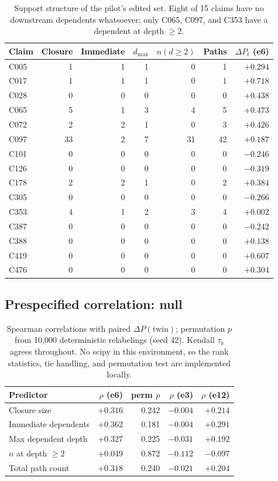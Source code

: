 \documentclass[11pt]{article}
\begin{document}
\begin{table}[h]
\centering
\begin{tabular}{lrrrrrr}
\toprule
Claim & Closure & Immediate & $d_{\max}$ & $n(d\geq2)$ & Paths & $\Delta P_t$ (e6) \\
\midrule
C005 & 1  & 1 & 1 & 0  & 1  & $+0.294$ \\
C017 & 1  & 1 & 1 & 0  & 1  & $+0.718$ \\
C028 & 0  & 0 & 0 & 0  & 0  & $+0.438$ \\
C065 & 5  & 1 & 3 & 4  & 5  & $+0.473$ \\
C072 & 2  & 2 & 1 & 0  & 3  & $+0.426$ \\
C097 & 33 & 2 & 7 & 31 & 42 & $+0.187$ \\
C101 & 0  & 0 & 0 & 0  & 0  & $-0.246$ \\
C126 & 0  & 0 & 0 & 0  & 0  & $-0.319$ \\
C178 & 2  & 2 & 1 & 0  & 2  & $+0.384$ \\
C305 & 0  & 0 & 0 & 0  & 0  & $-0.266$ \\
C353 & 4  & 1 & 2 & 3  & 4  & $+0.002$ \\
C387 & 0  & 0 & 0 & 0  & 0  & $-0.242$ \\
C388 & 0  & 0 & 0 & 0  & 0  & $+0.138$ \\
C419 & 0  & 0 & 0 & 0  & 0  & $+0.607$ \\
C476 & 0  & 0 & 0 & 0  & 0  & $+0.304$ \\
\bottomrule
\end{tabular}
\caption{Support structure of the pilot's edited set. Eight of 15 claims have no
downstream dependents whatsoever; only C065, C097, and C353 have a dependent at
depth $\geq2$.}
\end{table}

\subsection{Prespecified correlation: null}

\begin{table}[h]
\centering
\begin{tabular}{lrrrr}
\toprule
Predictor & $\rho$ (e6) & perm $p$ & $\rho$ (e3) & $\rho$ (e12) \\
\midrule
Closure size          & $+0.316$ & 0.242 & $-0.004$ & $+0.214$ \\
Immediate dependents  & $+0.362$ & 0.181 & $-0.004$ & $+0.291$ \\
Max dependent depth   & $+0.327$ & 0.225 & $-0.031$ & $+0.192$ \\
$n$ at depth $\geq2$  & $+0.049$ & 0.872 & $-0.112$ & $-0.097$ \\
Total path count      & $+0.318$ & 0.240 & $-0.021$ & $+0.204$ \\
\bottomrule
\end{tabular}
\caption{Spearman correlations with paired $\Delta P(\mathrm{twin})$;
permutation $p$ from 10{,}000 deterministic relabelings (seed 42). Kendall
$\tau_b$ agrees throughout. No scipy in this environment, so the rank
statistics, tie handling, and permutation test are implemented locally.}
\end{table}
\end{document}
